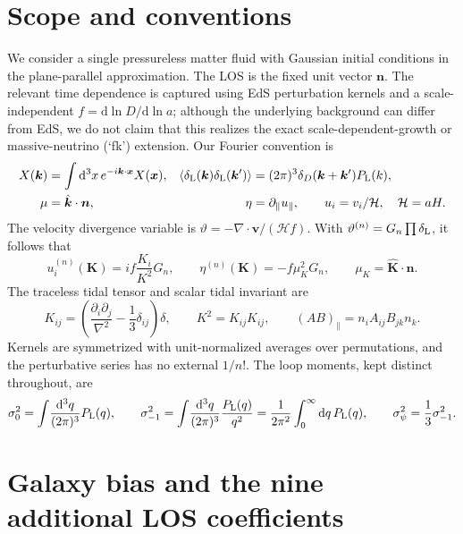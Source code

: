\documentclass[11pt,a4paper]{article}
\newcommand{\dd}{\mathrm d}
\newcommand{\intq}{\int\!\frac{\dd^3 q}{(2\pi)^3}}
\newcommand{\Pl}{P_{\rm L}}
\newcommand{\bn}{\bm n}
\newcommand{\bk}{\bm k}
\newcommand{\dL}{\delta_{\rm L}}
\newcommand{\sigs}{\sigma_{-1}^2}
\begin{document}
\section{Scope and conventions}
We consider a single pressureless matter fluid with Gaussian initial conditions in the plane-parallel approximation. The LOS is the fixed unit vector $\bn$. The relevant time dependence is captured using EdS perturbation kernels and a scale-independent $f=\dd\ln D/\dd\ln a$; although the underlying background can differ from EdS, we do not claim that this realizes the exact scale-dependent-growth or massive-neutrino (`fk') extension.
Our Fourier convention is
\begin{align}
X(\bk)&=\int \dd^3x\,e^{-i\bk\cdot\bm x}X(\bm x), &
\langle\dL(\bk)\dL(\bk')\rangle&=(2\pi)^3\delta_D(\bk+\bk')\Pl(k),\\
\mu&=\hat{\bk}\cdot\bn, &\eta&=\partial_\parallel u_\parallel,\qquad u_i=v_i/\mathcal H,\quad \mathcal H=aH.
\end{align}
The velocity divergence variable is $\vartheta=-\nabla\cdot\bm v/(\mathcal H f)$. With $\vartheta^{(n)}=G_n\prod\dL$, it follows that
\begin{equation}
 u_i^{(n)}(\bm K)=if\frac{K_i}{K^2}G_n,
 \qquad \eta^{(n)}(\bm K)=-f\mu_K^2G_n,
 \qquad \mu_K=\hat{\bm K}\cdot\bn.
\end{equation}
The traceless tidal tensor and scalar tidal invariant are
\begin{equation}
 K_{ij}=\left(\frac{\partial_i\partial_j}{\nabla^2}-\frac13\delta_{ij}\right)\delta,
 \qquad K^2=K_{ij}K_{ij},\qquad (AB)_\parallel=n_iA_{ij}B_{jk}n_k.
\end{equation}
Kernels are symmetrized with unit-normalized averages over permutations, and the perturbative series has no external $1/n!$. The loop moments, kept distinct throughout, are
\begin{equation}
 \sigma_0^2=\intq\Pl(q),\qquad
 \sigs=\intq\frac{\Pl(q)}{q^2}=\frac{1}{2\pi^2}\int_0^\infty\dd q\,\Pl(q),\qquad
 \sigma_\psi^2=\frac13\sigs.
\end{equation}

\section{Galaxy bias and the nine additional LOS coefficients}
\end{document}
